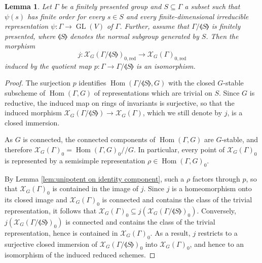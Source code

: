 \documentclass[11pt, a4paper]{amsart}
\newtheorem{lemma}[theorem]{Lemma}
\theoremstyle{definition}
\theoremstyle{myitemstyle}
\newcommand{\red}{{\mathrm{red}}}
\newcommand{\mc}[1]{{\mathcal{#1}}}
\DeclareMathOperator{\Hom}{Hom}
\DeclareMathOperator{\GL}{GL}
\begin{document}
\begin{lemma}
\label{lem:quotient by finite-order-in-rep-elements}
Let $\Gamma$ be a finitely presented group and $S\subseteq \Gamma$ a subset such that $\psi(s)$ has finite order for every $s\in S$ and every finite-dimensional irreducible representation $\psi\colon \Gamma\to \GL(V)$ of $\Gamma$. Further, assume that $\Gamma/\llangle S\rrangle$ is finitely presented, where $\llangle S\rrangle$ denotes the normal subgroup generated by $S$. Then the morphism
\[
    j\colon \mc X_G(\Gamma/\llangle S\rrangle)_{0,\red}\to \mc X_G(\Gamma)_{0,\red}
\]
induced by the quotient map $p\colon\Gamma\to \Gamma/\llangle S\rrangle$ is an isomorphism.
\end{lemma}
\begin{proof}
The surjection $p$ identifies $\Hom(\Gamma/\llangle S\rrangle,G)$ with the closed $G$-stable subscheme of $\Hom(\Gamma,G)$ of representations which are trivial on $S$. Since $G$ is reductive, the induced map on rings of invariants is surjective, so that the induced morphism $\mc X_G(\Gamma/\llangle S\rrangle)\to\mc X_G(\Gamma)$, which we still denote by $j$, is a closed immersion.

As $G$ is connected, the connected components of $\Hom(\Gamma,G)$ are $G$-stable, and therefore $\mc X_G(\Gamma)_0=\Hom(\Gamma,G)_0/\!/G$. In particular, every point of $\mc X_G(\Gamma)_0$ is represented by a semisimple representation $\rho\in\Hom(\Gamma,G)_0$.

By Lemma \ref{lem:unipotent on identity component}, such a $\rho$ factors through $p$, so that $\mc X_G(\Gamma)_0$ is contained in the image of $j$. Since $j$ is a homeomorphism onto its closed image and $\mc X_G(\Gamma)_0$ is connected and contains the class of the trivial representation, it follows that $\mc X_G(\Gamma)_0\subseteq j(\mc X_G(\Gamma/\llangle S\rrangle)_0)$. Conversely, $j(\mc X_G(\Gamma/\llangle S\rrangle)_0)$ is connected and contains the class of the trivial representation, hence is contained in $\mc X_G(\Gamma)_0$. As a result, $j$ restricts to a surjective closed immersion of $\mc X_G(\Gamma/\llangle S\rrangle)_0$ into $\mc X_G(\Gamma)_0$, and hence to an isomorphism of the induced reduced schemes.
\end{proof}
\end{document}

